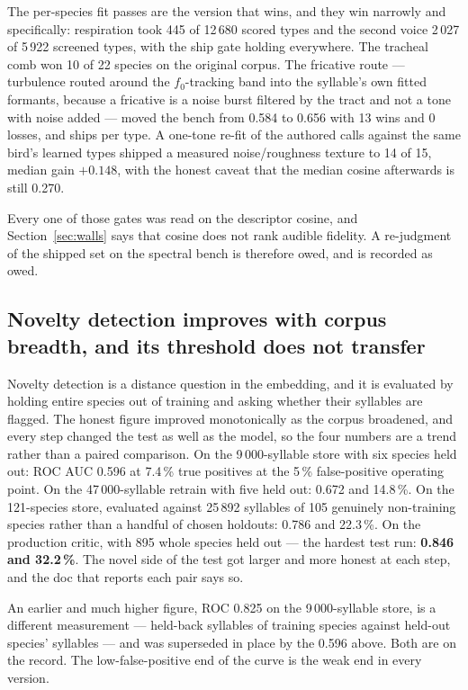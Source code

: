 \documentclass[10pt,twocolumn,a4paper]{article}
\begin{document}
The per-species fit passes are the version that wins, and they win narrowly and
specifically: respiration took 445 of 12\,680 scored types and the second voice 2\,027 of
5\,922 screened types, with the ship gate holding everywhere. The tracheal comb won 10 of 22
species on the original corpus. The fricative route --- turbulence routed around the
$f_0$-tracking band into the syllable's own fitted formants, because a fricative is a noise
burst filtered by the tract and not a tone with noise added --- moved the bench from 0.584 to
0.656 with 13 wins and 0 losses, and ships per type. A one-tone re-fit of the authored calls
against the same bird's learned types shipped a measured noise/roughness texture to 14 of 15,
median gain $+0.148$, with the honest caveat that the median cosine afterwards is still
0.270.

Every one of those gates was read on the descriptor cosine, and Section~\ref{sec:walls} says
that cosine does not rank audible fidelity. A re-judgment of the shipped set on the spectral
bench is therefore owed, and is recorded as owed.

\subsection{Novelty detection improves with corpus breadth, and its threshold does not transfer}

Novelty detection is a distance question in the embedding, and it is evaluated by holding
entire species out of training and asking whether their syllables are flagged. The honest
figure improved monotonically as the corpus broadened, and every step changed the test as well
as the model, so the four numbers are a trend rather than a paired comparison. On the
9\,000-syllable store with six species held out: ROC AUC 0.596 at 7.4\,\% true positives at
the 5\,\% false-positive operating point. On the 47\,000-syllable retrain with five held out:
0.672 and 14.8\,\%. On the 121-species store, evaluated against 25\,892 syllables of 105
genuinely non-training species rather than a handful of chosen holdouts: 0.786 and 22.3\,\%. On
the production critic, with 895 whole species held out --- the hardest test run: \textbf{0.846
and 32.2\,\%}. The novel side of the test got larger and more honest at each step, and the doc
that reports each pair says so.

An earlier and much higher figure, ROC 0.825 on the 9\,000-syllable store, is a different
measurement --- held-back syllables of training species against held-out species' syllables ---
and was superseded in place by the 0.596 above. Both are on the record. The low-false-positive
end of the curve is the weak end in every version.
\end{document}
